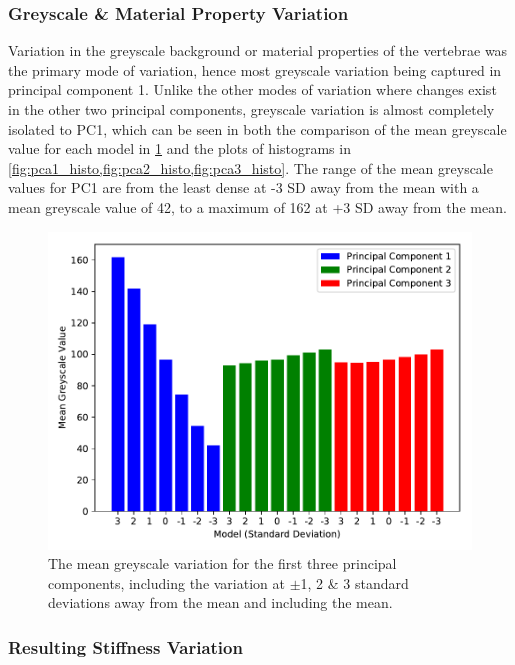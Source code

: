 \pagebreak



\subsubsection{Greyscale \& Material Property Variation}

Variation in the greyscale background or material properties of the vertebrae was the primary mode of variation, hence most greyscale variation being captured in principal component 1.
Unlike the other modes of variation where changes exist in the other two principal components, greyscale variation is almost completely isolated to PC1, which can be seen in both the comparison of the mean greyscale value for each model in \cref{fig:pca_gs} and the plots of histograms in \cref{fig:pca1_histo,fig:pca2_histo,fig:pca3_histo}.
The range of the mean greyscale values for PC1 are from the least dense at -3 SD away from the mean with a mean greyscale value of 42, to a maximum of 162 at +3 SD away from the mean.

\begin{figure}[h]
  \centering
  \includegraphics[width=.9\textwidth]{Chapters/Chapter_PCA_images/pca_gs.pdf}
  \caption{The mean greyscale variation for the first three principal components, including the variation at $\pm$1, 2 \& 3 standard deviations away from the mean and including the mean.}
  \label{fig:pca_gs}
\end{figure}


\subsubsection{Resulting Stiffness Variation}

